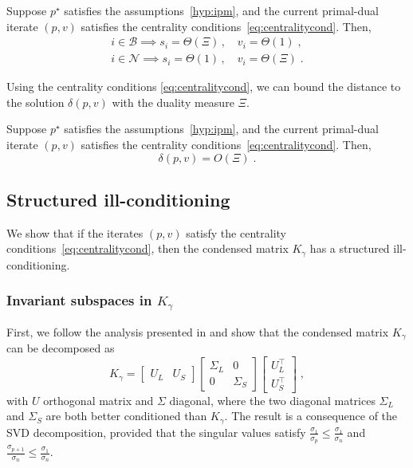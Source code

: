 \begin{proposition}
  \label{prop:cond:boundslack}
  Suppose $p^\star$ satisfies the assumptions~\ref{hyp:ipm},
  and the current primal-dual iterate $(p, v)$ satisfies the centrality
  conditions~\eqref{eq:centralitycond}. Then,
  \begin{subequations}
    \begin{align}
      i \in \mathcal{B} \implies s_i = \Theta(\Xi) \, , \quad v_i = \Theta(1) \;, \\
      i \in \mathcal{N} \implies s_i = \Theta(1) \, , \quad v_i = \Theta(\Xi) \; .
    \end{align}
  \end{subequations}
\end{proposition}
Using the centrality conditions \eqref{eq:centralitycond}, we can bound
the distance to the solution $\delta(p, v)$ with the duality measure $\Xi$.
\begin{theorem}
  Suppose $p^\star$ satisfies the assumptions~\ref{hyp:ipm},
  and the current primal-dual iterate $(p, v)$ satisfies the centrality
  conditions~\eqref{eq:centralitycond}. Then,
  \begin{equation}
    \delta(p, v) = O(\Xi) \; .
  \end{equation}
\end{theorem}

\subsection{Structured ill-conditioning}
We show that if the iterates $(p, v)$ satisfy
the centrality conditions~\eqref{eq:centralitycond}, then the
condensed matrix $K_\gamma$ has a structured ill-conditioning.

\subsubsection{Invariant subspaces in $K_\gamma$}
First, we follow the analysis presented in \cite{wright1998ill}
and show that the condensed matrix $K_\gamma$ can be decomposed as
\begin{equation}
  \label{eq:cond:svd}
  K_\gamma = \begin{bmatrix} U_L & U_S \end{bmatrix}
  \begin{bmatrix}
    \Sigma_L & 0 \\ 0 & \Sigma_S
  \end{bmatrix}
  \begin{bmatrix}
    U_L^\top \\ U_S^\top
  \end{bmatrix}
  \; ,
\end{equation}
with $U$ orthogonal matrix and $\Sigma$ diagonal, where
the two diagonal matrices $\Sigma_L$ and $\Sigma_S$ are both better conditioned than $K_\gamma$.
The result is a consequence of the SVD decomposition,
provided that the singular values satisfy $\frac{\sigma_1}{\sigma_{p}} \leq \frac{\sigma_1}{\sigma_n}$
and $\frac{\sigma_{p+1}}{\sigma_{n}} \leq \frac{\sigma_1}{\sigma_n}$.

